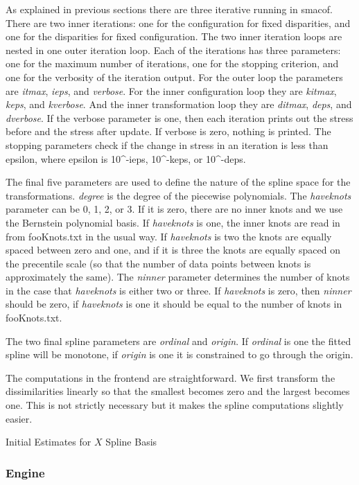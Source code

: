 \documentclass[
  12pt,
]{article}
\begin{document}
As explained in previous sections there are three iterative running in smacof. There
are two inner iterations: one for the configuration for fixed disparities, and one
for the disparities for fixed configuration. The two inner iteration loops are nested
in one outer iteration loop. Each of the iterations has three parameters: one for the
maximum number of iterations, one for the stopping criterion, and one for the
verbosity of the iteration output. For the outer loop the parameters are
\emph{itmax}, \emph{ieps}, and \emph{verbose}. For the inner configuration loop they are
\emph{kitmax}, \emph{keps}, and \emph{kverbose}. And the inner transformation loop they are
\emph{ditmax}, \emph{deps}, and \emph{dverbose}. If the verbose parameter is one, then
each iteration prints out the stress before and the stress after update.
If verbose is zero, nothing is printed. The stopping parameters check if
the change in stress in an iteration is less than epsilon, where
epsilon is 10\^{}-ieps, 10\^{}-keps, or 10\^{}-deps.

The final five parameters are used to define the nature of the
spline space for the transformations. \emph{degree} is the degree of the
piecewise polynomials. The \emph{haveknots} parameter can be 0, 1, 2, or
3. If it is zero, there are no inner knots and we use the Bernstein
polynomial basis. If \emph{haveknots} is one, the inner knots are
read in from fooKnots.txt in the usual way. If \emph{haveknots} is two
the knots are equally spaced between zero and one, and if it is
three the knots are equally spaced on the precentile scale (so that
the number of data points between knots is approximately the
same). The \emph{ninner} parameter determines the number of knots in the case that
\emph{haveknots} is either two or three. If \emph{haveknots} is zero, then \emph{ninner}
should be zero, if \emph{haveknots} is one it should be equal to the
number of knots in fooKnots.txt.

The two final spline parameters are \emph{ordinal} and \emph{origin}. If \emph{ordinal}
is one the fitted spline will be monotone, if \emph{origin} is one it is constrained to go
through the origin.

The computations in the frontend are straightforward. We first transform the
dissimilarities linearly so that the smallest becomes zero and the largest
becomes one. This is not strictly necessary but it makes the spline computations
slightly easier.

Initial Estimates for \(X\)
Spline Basis

\subsubsection{Engine}\label{engine}
\end{document}
